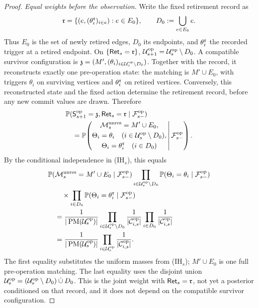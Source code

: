 \begin{proof}
\emph{Equal weights before the observation.}
Write the fixed retirement record as
\[
 \mathfrak r
 =\{(e,(\theta_i^{\mathfrak r})_{i\in e}):e\in E_0\},
 \qquad D_0:=\bigcup_{e\in E_0}e.
\]
Thus \(E_0\) is the set of newly retired edges, \(D_0\) its endpoints,
and \(\theta_i^{\mathfrak r}\) the recorded trigger at a retired
endpoint. On \(\{\mathsf{Ret}_{s}=\mathfrak r\}\),
\(\mathcal U^{\mathrm{op}}_{s+1}=\mathcal U^{\mathrm{op}}_{s}\setminus D_0\).
A compatible survivor configuration is
\(\mathfrak z=(M',
 (\theta_i)_{i\in\mathcal U^{\mathrm{op}}_{s}\setminus D_0})\).
Together with the record, it reconstructs exactly one pre-operation state:
the matching is \(M'\cup E_0\), with triggers \(\theta_i\) on surviving
vertices and \(\theta_i^{\mathfrak r}\) on retired vertices.
Conversely, this reconstructed state and the fixed action determine the
retirement record, before any new commit values are drawn. Therefore
\begin{align*}
 &\mathbb P(\mathsf S^{\mathrm{op}}_{s+1}=\mathfrak z,
       \mathsf{Ret}_{s}=\mathfrak r\mid\mathcal F^{\mathrm{op}}_{s-})\\
 &\quad=
 \mathbb P\!\left(
 \begin{gathered}
  \mathcal M_{s}^{\mathrm{unres}}=M'\cup E_0,\\
  \Theta_{i}=\theta_i\quad(i\in\mathcal U^{\mathrm{op}}_{s}\setminus D_0),\\
  \Theta_{i}=\theta_i^{\mathfrak r}\quad(i\in D_0)
 \end{gathered}
 \,\middle|\,\mathcal F^{\mathrm{op}}_{s-}\right).
\end{align*}
By the conditional independence in (IH\(_s\)), this equals
\begin{align*}
 &\mathbb P(\mathcal M_{s}^{\mathrm{unres}}=M'\cup E_0\mid\mathcal F^{\mathrm{op}}_{s-})
   \prod_{i\in\mathcal U^{\mathrm{op}}_{s}\setminus D_0}
      \mathbb P(\Theta_{i}=\theta_i\mid\mathcal F^{\mathrm{op}}_{s-})\\
 &\qquad\times\prod_{i\in D_0}
      \mathbb P(\Theta_{i}=\theta_i^{\mathfrak r}
                      \mid\mathcal F^{\mathrm{op}}_{s-})\\
 &\quad=\frac{1}{|\operatorname{PM}(\mathcal U^{\mathrm{op}}_{s})|}
          \prod_{i\in\mathcal U^{\mathrm{op}}_{s}\setminus D_0}
                 \frac{1}{|\mathcal C^{\mathrm{op}}_{i,s}|}
          \prod_{i\in D_0}\frac{1}{|\mathcal C^{\mathrm{op}}_{i,s}|}\\
 &\quad=\frac{1}{|\operatorname{PM}(\mathcal U^{\mathrm{op}}_{s})|}
          \prod_{i\in\mathcal U^{\mathrm{op}}_{s}}
                 \frac{1}{|\mathcal C^{\mathrm{op}}_{i,s}|}.
\end{align*}
The first equality substitutes the uniform masses from (IH\(_s\));
\(M'\cup E_0\) is one full pre-operation matching. The last equality
uses the disjoint union
\(\mathcal U^{\mathrm{op}}_{s}
 =(\mathcal U^{\mathrm{op}}_{s}\setminus D_0)\mathbin{\dot\cup}D_0\).
This is the joint weight with \(\mathsf{Ret}_{s}=\mathfrak r\),
not yet a posterior conditioned on that record, and it does not depend
on the compatible survivor configuration.


\end{proof}
